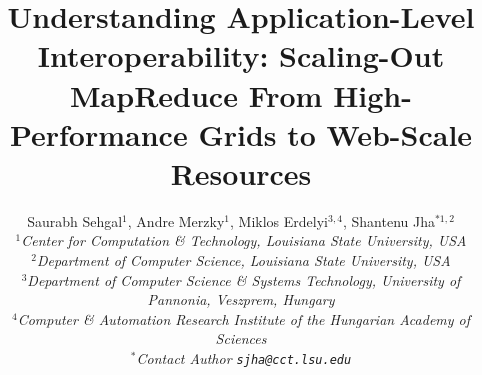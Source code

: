 \documentclass[3p,twocolumn]{elsarticle}
\begin{document}
\title{Understanding Application-Level Interoperability: Scaling-Out
  MapReduce From High-Performance Grids to Web-Scale Resources}

     \author{Saurabh Sehgal$^1$, Andre Merzky$^{1}$, Miklos
       Erdelyi$^{3,4}$, Shantenu Jha$^{*1,2}$
       \\
       \small{\emph{$^{1}$Center for Computation \& Technology, Louisiana State University, USA}}\\
       \small{\emph{$^{2}$Department of Computer Science, Louisiana State University, USA}}\\
       \small{\emph{$^{3}$Department of Computer Science \& Systems
           Technology, University of
           Pannonia, Veszprem, Hungary}}\\
       \small{\emph{$^{4}$Computer \& Automation Research Institute of
           the Hungarian Academy of
           Sciences}}\\
       \small{\emph{$^{*}$Contact Author \texttt{sjha@cct.lsu.edu}}}
       \upp\upp\upp\upp\upp
       }

\newif\ifdraft
\drafttrue
\ifdraft
 \newcommand{\amnote}[1]{     {\textcolor{magenta} { ***AM: #1 }}}
 \newcommand{\jhanote}[1]{    {\textcolor{red}     { ***SJ: #1 }}}
 \newcommand{\miklosnote}[1]{ {\textcolor{blue}    { ***ME: #1 }}}
 \newcommand{\ssnote}[1]{     {\textcolor{blue}    { ***SS: #1 }}}
\else
 \newcommand{\amnote}[1]{}
 \newcommand{\jhanote}[1]{}
 \newcommand{\miklosnote}[1]{}
 \newcommand{\ssnote}[1]{}
\fi

\newcommand{\sagamapreduce}{SAGA-MapReduce\xspace}
\newcommand{\smr}{\sagamapreduce}
\newcommand{\mr}{MapReduce\xspace}
\newcommand{\tc}{$T_c$\xspace}
\newcommand{\wc}{wordcount\xspace}
\newcommand{\Wc}{Wordcount\xspace}

\newcommand{\dn}{\vspace*{0.33em}}
\newcommand{\dnn}{\vspace*{0.66em}}
\newcommand{\dnnn}{\vspace*{1em}}
\newcommand{\uppp}{\vspace*{-1em}}
\newcommand{\upp}{\vspace*{-0.66em}}
\newcommand{\up}{\vspace*{-0.33em}}
\newcommand{\shift}{\hspace*{1.00em}}

\newcommand{\T}[1]{\texttt{#1}}
\newcommand{\I}[1]{\textit{#1}}
\newcommand{\B}[1]{\textbf{#1}}
\newcommand{\F}[1]{\B{[FIXME: #1]}}
\newcommand{\TODO}[1]{\textcolor{red}{\B{TODO: #1}}}
\end{document}
